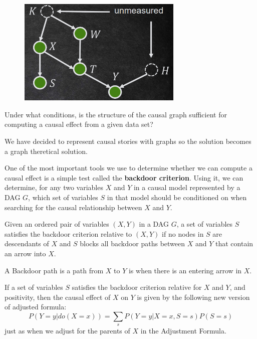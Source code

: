 \begin{figure}[h]
      \centering
      \includegraphics*[width=0.7\textwidth]{img/unmeasured_parents.png}
\end{figure}

\begin{center}
      Under what conditions, is the structure of the causal graph sufficient for
      computing a causal effect from a given data set?
\end{center}

We have decided to represent causal stories with graphs so the solution becomes a graph theretical
solution.

One of the most important tools we use to determine whether we can compute a
causal effect is a simple test called the \textbf{backdoor criterion}. Using it,
we can determine, for any two variables $X$ and $Y$ in a causal model represented
by a DAG $G$, which set of variables $S$ in that model should be conditioned on
when searching for the causal relationship between $X$ and $Y$.

\begin{definition}
      Given an ordered pair of variables $(X, Y)$ in a DAG $G$, a set of variables
      $S$ satisfies the backdoor criterion relative to $(X, Y)$ if no nodes
      in $S$ are descendants of $X$ and $S$ blocks all backdoor paths between $X$
      and $Y$ that contain an arrow into $X$.

\end{definition}
\begin{definition}
      A Backdoor path is a path from $X$ to $Y$ is when there is an entering arrow in $X$.
\end{definition}

\begin{definition}

      If a set of variables $S$ satisfies the backdoor criterion relative for $X$ and
      $Y$, and positivity, then the causal effect of $X$ on $Y$ is given by the following new version
      of adjusted formula:
      \begin{equation}
            P(Y = y| do(X = x)) = \sum_{s} P(Y = y| X = x, S = s)P(S = s)
      \end{equation}
      just as when we adjust for the parents of $X$ in the Adjustment Formula.
\end{definition}


